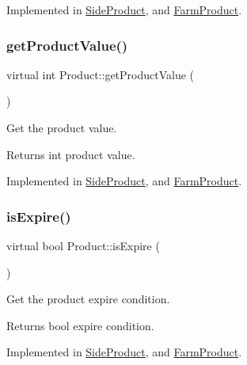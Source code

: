 Implemented in \hyperlink{classSideProduct_a2ea1a135e6456d0220f3ba3d3e8c9dfb}{Side\+Product}, and \hyperlink{classFarmProduct_a2a7526789b3ab01a8fda7773aa2c0565}{Farm\+Product}.

\mbox{\label{classProduct_a5c56d625cae28f43b626578ac4611e43}} 
\subsubsection{\texorpdfstring{get\+Product\+Value()}{getProductValue()}}
{\footnotesize\ttfamily virtual int Product\+::get\+Product\+Value (\begin{DoxyParamCaption}{ }\end{DoxyParamCaption})\hspace{0.3cm}{\ttfamily [pure virtual]}}

Get the product value. \begin{DoxyReturn}{Returns}
int product value. 
\end{DoxyReturn}


Implemented in \hyperlink{classSideProduct_ae37e75482c8ddaf7abe070054fad58eb}{Side\+Product}, and \hyperlink{classFarmProduct_ae169937bd043517efa0a05be844aaa35}{Farm\+Product}.

\mbox{\label{classProduct_aec86d25d77417014f8780ea65416bac7}} 
\subsubsection{\texorpdfstring{is\+Expire()}{isExpire()}}
{\footnotesize\ttfamily virtual bool Product\+::is\+Expire (\begin{DoxyParamCaption}{ }\end{DoxyParamCaption})\hspace{0.3cm}{\ttfamily [pure virtual]}}

Get the product expire condition. \begin{DoxyReturn}{Returns}
bool expire condition. 
\end{DoxyReturn}


Implemented in \hyperlink{classSideProduct_a9a37b515860c516ec28749f5b562aa0f}{Side\+Product}, and \hyperlink{classFarmProduct_a18cb875372c4e24ef79615bcd47a110e}{Farm\+Product}.

